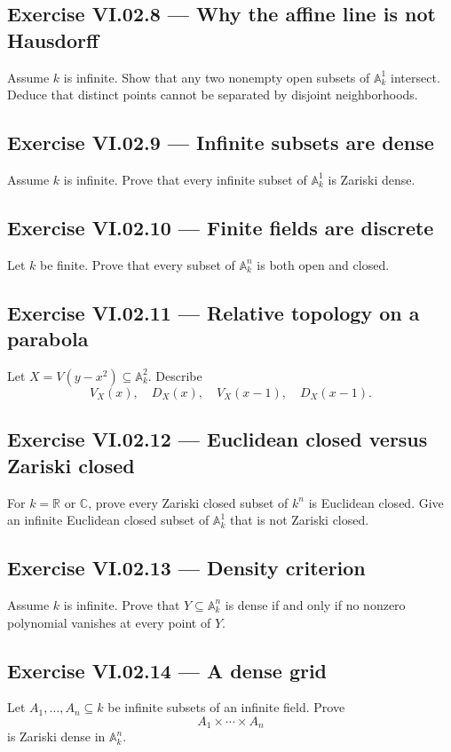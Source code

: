 \subsection*{Exercise VI.02.8 --- Why the affine line is not Hausdorff}
\label{ex:vi02-8}
Assume \(k\) is infinite.  Show that any two nonempty open subsets of \(\mathbb A_k^1\)
intersect.  Deduce that distinct points cannot be separated by disjoint neighborhoods.

\subsection*{Exercise VI.02.9 --- Infinite subsets are dense}
\label{ex:vi02-9}
Assume \(k\) is infinite.  Prove that every infinite subset of \(\mathbb A_k^1\) is Zariski
dense.

\subsection*{Exercise VI.02.10 --- Finite fields are discrete}
\label{ex:vi02-10}
Let \(k\) be finite.  Prove that every subset of \(\mathbb A_k^n\) is both open and closed.

\subsection*{Exercise VI.02.11 --- Relative topology on a parabola}
\label{ex:vi02-11}
Let \(X=V(y-x^2)\subseteq\mathbb A_k^2\).  Describe
\[
V_X(x),\quad D_X(x),\quad V_X(x-1),\quad D_X(x-1).
\]

\subsection*{Exercise VI.02.12 --- Euclidean closed versus Zariski closed}
\label{ex:vi02-12}
For \(k=\mathbb R\) or \(\mathbb C\), prove every Zariski closed subset of \(k^n\) is
Euclidean closed.  Give an infinite Euclidean closed subset of \(\mathbb A_k^1\) that is not
Zariski closed.

\subsection*{Exercise VI.02.13 --- Density criterion}
\label{ex:vi02-13}
Assume \(k\) is infinite.  Prove that \(Y\subseteq\mathbb A_k^n\) is dense if and only if
no nonzero polynomial vanishes at every point of \(Y\).

\subsection*{Exercise VI.02.14 --- A dense grid}
\label{ex:vi02-14}
Let \(A_1,\dots,A_n\subseteq k\) be infinite subsets of an infinite field.  Prove
\[
A_1\times\cdots\times A_n
\]
is Zariski dense in \(\mathbb A_k^n\).


